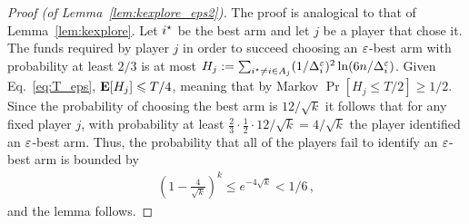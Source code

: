\documentclass{article}
\begin{document}
\begin{proof}[Proof (of Lemma~\ref{lem:kexplore_eps2})]
The proof is analogical to that of Lemma~\ref{lem:kexplore}.
Let $i^\star$ be the best arm and let $j$ be a player that chose it. The funds required by player $j$ in order to succeed choosing an $\varepsilon$-best arm with probability at least $2/3$ is at most
$
	H_j	:= \sum_{i^\star \ne i \in A_j}
		(1/\Delta_i^{\varepsilon})^2 \ln (6n/\Delta_i^{\varepsilon})
$.
Given Eq.~\eqref{eq:T_eps}, $\mathbf{E}[H_j] \leqslant T/4$, meaning that by Markov $\Pr[H_j \le T/2] \geq 1/2$. Since the probability of choosing the best arm is $12/\sqrt{k}$ it follows that for any fixed player $j$, with probability at least $\tfrac{2}{3} \cdot \tfrac{1}{2} \cdot 12/\sqrt{k} = 4/\sqrt{k}$ the player identified an $\varepsilon$-best arm.
Thus, the probability that all of the players fail to identify an $\varepsilon$-best arm is bounded by
\begin{align*}
	\left( 1- \tfrac{4}{\sqrt{k}} \right)^k
	\le e^{-4\sqrt{k}}
	< 1/6 \,,
\end{align*}
and the lemma follows.
\end{proof}
\end{document}

